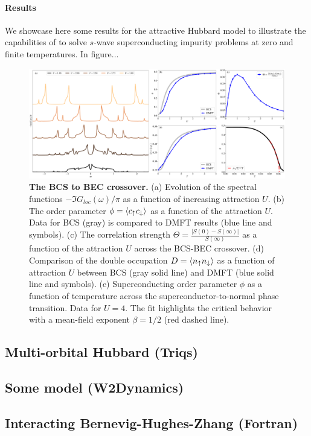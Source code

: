 \paragraph{Results}
We showcase here some results for the attractive Hubbard model to
illustrate the capabilities of \NAME to solve $s$-wave superconducting
impurity problems at zero and finite temperatures. 
In figure...
\begin{figure}[t!]
  \includegraphics[width=\linewidth]{figures/figAHM.pdf}
    \caption{\label{fig2}%
      \textbf{The BCS to BEC crossover.}
      (a) Evolution of the spectral functions
      $-\Im{G_{loc}(\omega)}/\pi$ as a function of increasing
      attraction $U$. 
      (b) The order parameter $\phi=\langle c_\uparrow c_\downarrow\rangle$ as a
      function of the attraction $U$. Data for BCS (gray) is compared
      to DMFT results (blue line and symbols). 
      (c) The correlation strength
      $\Theta=\frac{|S(0)-S(\infty)|}{S(\infty)}$ as a function of the
      attraction $U$ across the BCS-BEC crossover. 
      (d) Comparison of the double occupation $D=\langle n_\uparrow
      n_\downarrow\rangle$ as a function of attraction $U$ between BCS (gray
      solid line) and DMFT (blue solid line and symbols). 
      (e) Superconducting order
      parameter $\phi$ as a function of temperature across the
      superconductor-to-normal phase transition. Data for $U=4$. The
      fit highlights the critical behavior with a mean-field exponent
      $\beta=1/2$ (red dashed line).       
        }
\end{figure}





\subsection{Multi-orbital Hubbard (Triqs)}

\subsection{Some model (W2Dynamics)}

\subsection{Interacting Bernevig-Hughes-Zhang (Fortran)}

